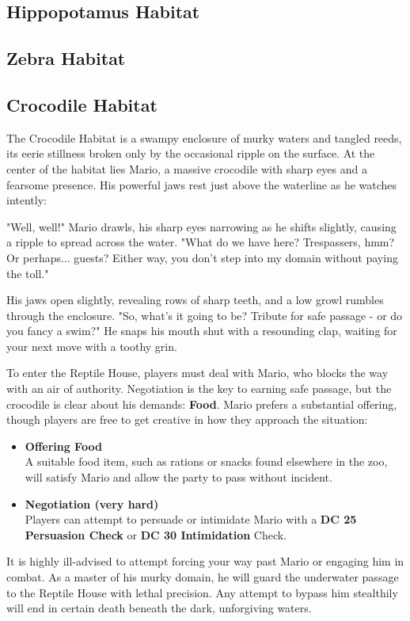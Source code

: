 \subsection*{ Hippopotamus Habitat}

\subsection*{ Zebra Habitat}

\subsection*{ Crocodile Habitat}
{\entryfont The Crocodile Habitat is a swampy enclosure of murky waters and tangled reeds, its eerie stillness broken only by the occasional ripple on the surface. At the center of the habitat lies Mario, a massive crocodile with sharp eyes and a fearsome presence. His powerful jaws rest just above the waterline as he watches intently:}
\begin{DndReadAloud}
	"Well, well!" Mario drawls, his sharp eyes narrowing as he shifts slightly, causing a ripple to spread across the water. "What do we have here? Trespassers, hmm? Or perhaps... guests? Either way, you don't step into my domain without paying the toll."

	His jaws open slightly, revealing rows of sharp teeth, and a low growl rumbles through the enclosure. "So, what's it going to be? Tribute for safe passage - or do you fancy a swim?" He snaps his mouth shut with a resounding clap, waiting for your next move with a toothy grin.
\end{DndReadAloud}
{\noindent\entryfont To enter the Reptile House, players must deal with Mario, who blocks the way with an air of authority. Negotiation is the key to earning safe passage, but the crocodile is clear about his demands: \textbf{Food}. Mario prefers a substantial offering, though players are free to get creative in how they approach the situation:
\begin{itemize}
	\renewcommand\labelitemi{\textbf{\textbullet}}%
	\item \textbf{Offering Food}\\
	A suitable food item, such as rations or snacks found elsewhere in the zoo, will satisfy Mario and allow the party to pass without incident.
	\item \textbf{Negotiation (very hard)}\\
	Players can attempt to persuade or intimidate Mario with a \textbf{DC 25 Persuasion Check} or \textbf{DC 30 Intimidation} Check.
\end{itemize}
It is highly ill-advised to attempt forcing your way past Mario or engaging him in combat. As a master of his murky domain, he will guard the underwater passage to the Reptile House with lethal precision. Any attempt to bypass him stealthily will end in certain death beneath the dark, unforgiving waters.
}

